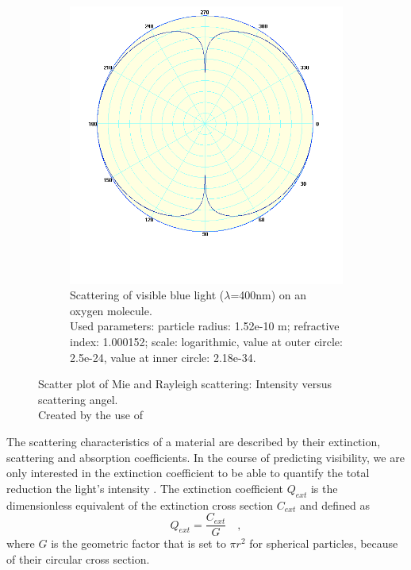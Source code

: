 \begin{figure}
\begin{subfigure}{0.45\textwidth}
        \includegraphics[width=\textwidth]{graphics/Rayleighscatter.png}
        \caption[Scattering on a Rain Drop]{Scattering of visible blue light ($\lambda$=400nm) on an oxygen molecule.\\ Used parameters: particle radius: 1.52e-10 m; refractive index: 1.000152; scale: logarithmic, value at outer circle: 2.5e-24, value at inner circle: 2.18e-34. \label{fig:blue-on-oxygen}  }
    \end{subfigure}
    \caption[Scatter Plots of Mie and Rayleigh scattering]{Scatter plot of Mie and Rayleigh scattering: Intensity versus scattering angel. \\Created by the use of  }
\end{figure}





The scattering characteristics of a material are described by their extinction, scattering and absorption coefficients. In the course of predicting  visibility, we are only interested in the extinction coefficient to be able to quantify the total reduction the light's intensity \cite{horvath1981atmospheric}.
The extinction coefficient $ Q_{ext}$ is the dimensionless equivalent of the extinction cross section $C_{ext}$ and defined as
\begin{equation}
    Q_{ext}=\frac{C_{ext}}{G} \quad ,
\end{equation}
where $G$ is the geometric factor that is set to $\pi r^{2}$ for spherical particles, because of their circular cross section.

